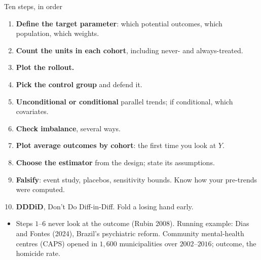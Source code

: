 \documentclass[
  11pt,
  ignorenonframetext,
  aspectratio=169,
]{beamer}
\providecommand{\tightlist}{%
  \setlength{\itemsep}{0pt}\setlength{\parskip}{0pt}}
\begin{document}
\begin{frame}{Ten steps, in order}
\protect{}\label{ten-steps-in-order}
\begin{enumerate}
\tightlist
\item
  \textbf{Define the target parameter}: which potential outcomes, which
  population, which weights.
\item
  \textbf{Count the units in each cohort}, including never- and
  always-treated.
\item
  \textbf{Plot the rollout.}
\item
  \textbf{Pick the control group} and defend it.
\item
  \textbf{Unconditional or conditional} parallel trends; if conditional,
  which covariates.
\item
  \textbf{Check imbalance}, several ways.
\item
  \textbf{Plot average outcomes by cohort}: the first time you look at
  \(Y\).
\item
  \textbf{Choose the estimator} from the design; state its assumptions.
\item
  \textbf{Falsify}: event study, placebos, sensitivity bounds. Know how
  your pre-trends were computed.
\item
  \textbf{DDDiD}, Don't Do Diff-in-Diff. Fold a losing hand early.
\end{enumerate}

\begin{itemize}
\tightlist
\item
  Steps \(1\)--\(6\) never look at the outcome (Rubin 2008). Running
  example: Dias and Fontes (2024), Brazil's psychiatric reform.
  Community mental-health centres (CAPS) opened in \(1{,}600\)
  municipalities over \(2002\)--\(2016\); outcome, the homicide rate.
\end{itemize}
\end{frame}
\end{document}
